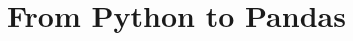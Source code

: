 \documentclass{book}
\begin{document}

\frontmatter



% 

\mainmatter


\part{From Python to Pandas}

%

%

%

%

%

%




%

%

%

% 











%

%



% 

%



%

%
\end{document}
